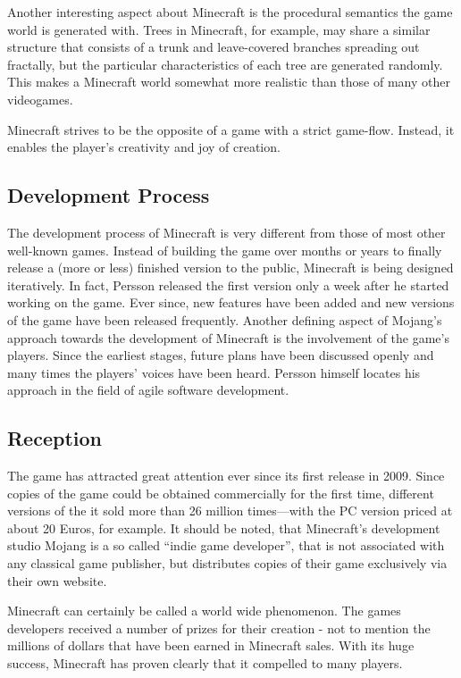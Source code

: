 Another interesting aspect about Minecraft is the procedural semantics the game world is generated with. Trees in Minecraft, for example, may share a similar structure that consists of a trunk and leave-covered branches spreading out fractally, but the particular characteristics of each tree are generated randomly. This makes a Minecraft world somewhat more realistic than those of many other videogames.

Minecraft strives to be the opposite of a game with a strict game-flow. Instead, it enables the player's creativity and joy of creation.

        \subsection{Development Process}
The development process of Minecraft is very different from those of most other well-known games. Instead of building the game over months or years to finally release a (more or less) finished version to the public, Minecraft is being designed iteratively. In fact, Persson released the first version only a week after he started working on the game. Ever since, new features have been added and new versions of the game have been released frequently. Another defining aspect of Mojang's approach towards the development of Minecraft is the involvement of the game's players. Since the earliest stages, future plans have been discussed openly and many times the players' voices have been heard. Persson himself locates his approach in the field of agile software development.

        \subsection{Reception}
The game has attracted great attention ever since its first release in 2009. Since copies of the game could be obtained commercially for the first time, different versions of the it sold more than 26 million times---with the PC version priced at about 20 Euros, for example. It should be noted, that Minecraft's development studio Mojang is a so called ``indie game developer'', that is not associated with any classical game publisher, but distributes copies of their game exclusively via their own website.

Minecraft can certainly be called a world wide phenomenon. The games developers received a number of prizes for their creation - not to mention the millions of dollars that have been earned in Minecraft sales. With its huge success, Minecraft has proven clearly that it compelled to many players.

